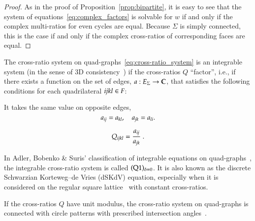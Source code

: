 \documentclass[Thesis]{subfiles}
\begin{document}
\begin{proof}
  As in the proof of Proposition~\ref{prop:bipartite}, it is easy to
  see that the system of equations~\eqref{eq:complex_factors} is
  solvable for $w$ if and only if the complex multi-ratios for even
  cycles are equal. Because $\Sigma$ is simply connected, this is the
  case if and only if the complex cross-ratios of corresponding faces
  are equal.
\end{proof}

\begin{remark}
  The cross-ratio system on quad-graphs~\eqref{eq:cross-ratio_system}
  is an integrable system (in the sense of 3D
  consistency~\cite{Bobenko-Suris2002, BobenkoSuris2008}) if the
  cross-ratios $Q$ ``factor'', i.e., if there exists a function on the
  set of edges, $a:E_{\Sigma}\rightarrow\mathbb C$, that satisfies the
  following conditions for each quadrilateral ${\it ijkl}\in F$:
  \begin{compactenum}[(i)]
  \item It takes the same value on opposite edges,
    \begin{equation}
      a_{\it ij}=a_{\it kl}, \quad a_{\it jk}=a_{\it li}.
    \end{equation}
  \item 
    \begin{equation}
      \label{eq:Q_factors}
      Q_{\it ijkl} = \frac{a_{\it ij}}{a_{\it jk}}\ .
    \end{equation}
  \end{compactenum}
  In Adler, Bobenko \& Suris' classification of integrable equations
  on quad-graphs~\cite{Adler-Bobenko-Suris2003}, the integrable
  cross-ratio system is called $({\rm Q1})_{\delta=0}$. It is also
  known as the discrete Schwarzian Korteweg--de Vries (dSKdV)
  equation, especially when it is considered on the regular square
  lattice~\cite{NijhoffCapel1995} with constant cross-ratios. 

  If the cross-ratios $Q$ have unit modulus, the cross-ratio system on
  quad-graphs is connected with circle patterns with prescribed
  intersection angles~\cite{Bobenko-Suris2002, BobenkoSuris2008}.
\end{remark}
\end{document}
